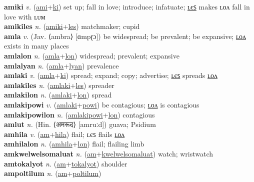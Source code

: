 \textbf{amiki} \textit{v.} (\hyperref[ami]{ami}+\hyperref[ki]{ki})
set up; fall in love; introduce; infatuate; \hyperref[amikiles]{ʟєꜱ} makes ʟᴏᴧ fall in love with ʟᴜᴍ \label{amiki} \\
\textbf{amikiles} \textit{n.} (\hyperref[amiki]{amiki}+\hyperref[les]{les})
matchmaker; cupid \label{amikiles} \\
\textbf{amla} \textit{v.} (Jav. ⟨ambra⟩ [ɑmpɽɔ])
be widespread; be prevalent; be expansive; \hyperref[amlalon]{ʟᴏᴧ} exists in many places \label{amla} \\
\textbf{amlalon} \textit{n.} (\hyperref[amla]{amla}+\hyperref[lon]{lon})
widespread; prevalent; expansive \label{amlalon} \\
\textbf{amlalyan} \textit{n.} (\hyperref[amla]{amla}+\hyperref[lyan]{lyan})
prevalence \label{amlalyan} \\
\textbf{amlaki} \textit{v.} (\hyperref[amla]{amla}+\hyperref[ki]{ki})
spread; expand; copy; advertise; \hyperref[amlakiles]{ʟєꜱ} spreads \hyperref[amlakilon]{ʟᴏᴧ} \label{amlaki} \\
\textbf{amlakiles} \textit{n.} (\hyperref[amlaki]{amlaki}+\hyperref[les]{les})
spreader \label{amlakiles} \\
\textbf{amlakilon} \textit{n.} (\hyperref[amlaki]{amlaki}+\hyperref[lon]{lon})
spread \label{amlakilon} \\
\textbf{amlakipowi} \textit{v.} (\hyperref[amlaki]{amlaki}+\hyperref[powi]{powi})
be contagious; \hyperref[amlakipowilon]{ʟᴏᴧ} is contagious \label{amlakipowi} \\
\textbf{amlakipowilon} \textit{n.} (\hyperref[amlakipowi]{amlakipowi}+\hyperref[lon]{lon})
contagious \label{amlakipowilon} \\
\textbf{amlut} \textit{n.} (Hin. ⟨अमरूद⟩ [amruːd])
guava; Psidium \label{amlut} \\
\textbf{amhila} \textit{v.} (\hyperref[am]{am}+\hyperref[hila]{hila})
flail; ʟєꜱ flails \hyperref[amhilalon]{ʟᴏᴧ} \label{amhila} \\
\textbf{amhilalon} \textit{n.} (\hyperref[amhila]{amhila}+\hyperref[lon]{lon})
flail; flailing limb \label{amhilalon} \\
\textbf{amkwelwelsomaluat} \textit{n.} (\hyperref[am]{am}+\hyperref[kwelwelsomaluat]{kwelwelsomaluat})
watch; wristwatch \label{amkwelwelsomaluat} \\
\textbf{amtokalyot} \textit{n.} (\hyperref[am]{am}+\hyperref[tokalyot]{tokalyot})
shoulder \label{amtokalyot} \\
\textbf{ampoltilum} \textit{n.} (\hyperref[am]{am}+\hyperref[poltilum]{poltilum})
